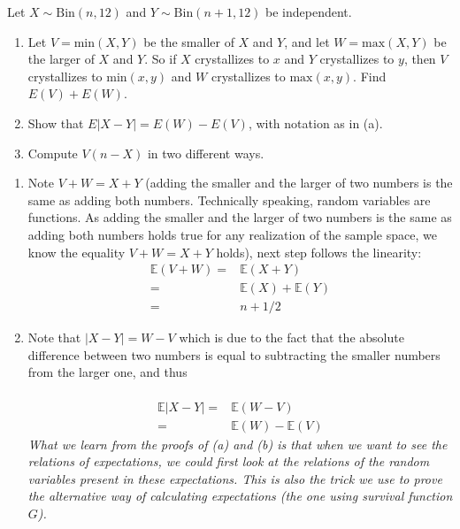 
\setcounter{theorem}{20}
\begin{exercise} [BH.4.21] Let $X \sim \text{Bin}(n, 12)$ and $Y \sim \text{Bin}(n + 1, 12)$ be independent.
	\begin{enumerate}
		\item Let $V = \text{min}(X,Y)$ be the smaller of $X$ and $Y$, and let $W = \text{max}(X,Y)$ be the larger of $X$ and $Y$. So if $X$ crystallizes to $x$ and $Y$ crystallizes to $y$, then $V$ crystallizes to $\text{min}(x, y)$ and $W$ crystallizes to $\text{max}(x, y)$. Find $E(V) + E(W)$.
		\item Show that $E|X - Y| = E(W) - E(V)$, with notation as in (a). 
		\item Compute $V(n - X)$ in two different ways.
	\end{enumerate}
\begin{solution}
    \begin{enumerate}
	    \item Note $V+W=X+Y$ (adding the smaller and the larger of two numbers
		is the same as adding both numbers. Technically speaking, random variables are functions. As adding the smaller and the larger of two numbers
		is the same as adding both numbers holds true for any realization of the sample space, we know the equality $V+W=X+Y$ holds), next step follows the linearity:\\
		\begin{align*}
			\mathbb{E}(V+W)=&\mathbb{E}(X+Y)\\
			=&\mathbb{E}(X)+\mathbb{E}(Y)\\
			=& n+1/2
		\end{align*}
		\item Note that $|X-Y|=W-V$ which is due to the fact that the absolute difference between two numbers is equal to subtracting the smaller numbers from the larger one, and thus  \\~\\
		\begin{align*}
			\mathbb{E}|X-Y|=&\mathbb{E}(W-V)\\
			=&\mathbb{E}(W)-\mathbb{E}(V) 
		\end{align*}
		\textit{What we learn from the proofs of (a) and (b) is that when we want to see the relations of expectations, we could first look at the relations of the random variables present in these expectations. This is also the trick we use to prove the alternative way of calculating expectations (the one using survival function $G$). }\\~\\

\end{enumerate}
\end{solution}
\end{exercise}
